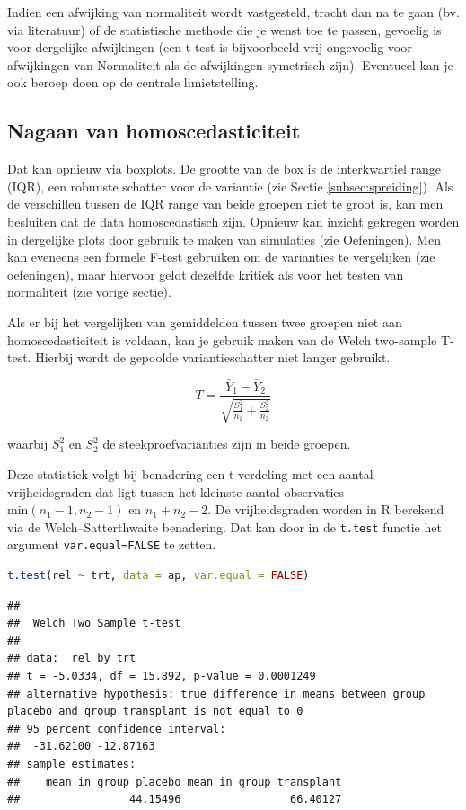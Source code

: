 \documentclass[
  12pt,dutch,coursenotes]{book}
\newcommand{\passthrough}[1]{#1}
\theoremstyle{definition}
\theoremstyle{definition}
\theoremstyle{definition}
\theoremstyle{definition}
\theoremstyle{remark}
\begin{document}
Indien een afwijking van normaliteit wordt vastgesteld, tracht dan na te gaan (bv. via literatuur) of de statistische methode die je wenst toe te passen, gevoelig is voor dergelijke afwijkingen (een t-test is bijvoorbeeld vrij ongevoelig voor afwijkingen van Normaliteit als de afwijkingen symetrisch zijn). Eventueel kan je ook beroep doen op de centrale limietstelling.

\hypertarget{nagaan-van-homoscedasticiteit}{%
\subsection{Nagaan van homoscedasticiteit}\label{nagaan-van-homoscedasticiteit}}

Dat kan opnieuw via boxplots.
De grootte van de box is de interkwartiel range (IQR), een robuuste schatter voor de variantie (zie Sectie \ref{subsec:spreiding}).
Als de verschillen tussen de IQR range van beide groepen niet te groot is, kan men besluiten dat de data homoscedastisch zijn.
Opnieuw kan inzicht gekregen worden in dergelijke plots door gebruik te maken van simulaties (zie Oefeningen).
Men kan eveneens een formele F-test gebruiken om de varianties te vergelijken (zie oefeningen), maar hiervoor geldt dezelfde kritiek als voor het testen van normaliteit (zie vorige sectie).

Als er bij het vergelijken van gemiddelden tussen twee groepen niet aan homoscedasticiteit is voldaan, kan je gebruik maken van de Welch two-sample T-test.
Hierbij wordt de gepoolde variantieschatter niet langer gebruikt.

\[T =  \frac{\bar{Y}_1 - \bar{Y}_2}{\sqrt{\frac{S^2_1}{n_1}+\frac{S^2_2}{n_2}}}\]

waarbij \(S^2_1\) en \(S^2_2\) de steekproefvarianties zijn in beide groepen.

Deze statistiek volgt bij benadering een t-verdeling met een aantal vrijheidsgraden dat ligt tussen het kleinste aantal observaties \(\text{min}(n_1-1,n_2-1)\) en \(n_1+n_2-2\).
De vrijheidsgraden worden in R berekend via de Welch--Satterthwaite benadering.
Dat kan door in de \passthrough{\lstinline!t.test!} functie het argument \passthrough{\lstinline!var.equal=FALSE!} te zetten.

\begin{lstlisting}[language=R]
t.test(rel ~ trt, data = ap, var.equal = FALSE)
\end{lstlisting}

\begin{lstlisting}
## 
##  Welch Two Sample t-test
## 
## data:  rel by trt
## t = -5.0334, df = 15.892, p-value = 0.0001249
## alternative hypothesis: true difference in means between group placebo and group transplant is not equal to 0
## 95 percent confidence interval:
##  -31.62100 -12.87163
## sample estimates:
##    mean in group placebo mean in group transplant 
##                 44.15496                 66.40127
\end{lstlisting}
\end{document}

